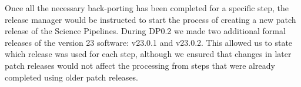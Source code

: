 Once all the necessary back-porting has been completed for a specific step, the release manager would be instructed to start the process of creating a new patch release of the Science Pipelines.
During DP0.2 we made two additional formal releases of the version 23 software: v23.0.1 and v23.0.2.
This allowed us to state which release was used for each step, although we ensured that changes in later patch releases would not affect the processing from steps that were already completed using older patch releases.
